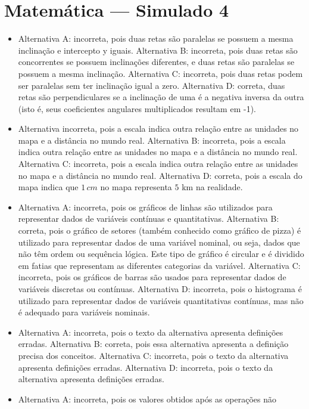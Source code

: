 \section*{Matemática — Simulado 4}

\begin{itemize}
\item Alternativa A: incorreta, pois duas retas são paralelas se possuem a
mesma inclinação e intercepto y iguais.
Alternativa B: incorreta, pois duas retas são concorrentes se possuem
inclinações diferentes, e duas retas são paralelas se possuem a mesma
inclinação.
Alternativa C: incorreta, pois duas retas podem ser paralelas sem ter
inclinação igual a zero.
Alternativa D: correta, duas retas são perpendiculares se a inclinação
de uma é a negativa inversa da outra (isto é, seus coeficientes
angulares multiplicados resultam em -1).
\item Alternativa incorreta, pois a escala indica outra relação entre as
unidades no mapa e a distância no mundo real.
Alternativa B: incorreta, pois a escala indica outra relação entre as
unidades no mapa e a distância no mundo real.
Alternativa C: incorreta, pois a escala indica outra relação entre as
unidades no mapa e a distância no mundo real.
Alternativa D: correta, pois a escala do mapa indica que $1\,cm$ no mapa
representa $5$ km na realidade. 
\item Alternativa A: incorreta, pois os gráficos de linhas são utilizados para
representar dados de variáveis contínuas e quantitativas.
Alternativa B: correta, pois o gráfico de setores (também conhecido como
gráfico de pizza) é utilizado para representar dados de uma variável
nominal, ou seja, dados que não têm ordem ou sequência lógica. Este tipo
de gráfico é circular e é dividido em fatias que representam as
diferentes categorias da variável.
Alternativa C: incorreta, pois os gráficos de barras são usados para
representar dados de variáveis discretas ou contínuas.
Alternativa D: incorreta, pois o histograma é utilizado para representar
dados de variáveis quantitativas contínuas, mas não é adequado para
variáveis nominais.
\item Alternativa A: incorreta, pois o texto da alternativa apresenta
definições erradas.
Alternativa B: correta, pois essa alternativa apresenta a definição
precisa dos conceitos.
Alternativa C: incorreta, pois o texto da alternativa apresenta
definições erradas.
Alternativa D: incorreta, pois o texto da alternativa apresenta
definições erradas.
\item Alternativa A: incorreta, pois os valores obtidos após as operações não

\end{itemize}
